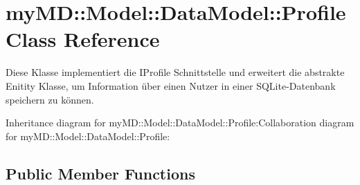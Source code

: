 \hypertarget{classmy_m_d_1_1_model_1_1_data_model_1_1_profile}{
\section{my\-MD::Model::Data\-Model::Profile Class Reference}
\label{d6/d2c/classmy_m_d_1_1_model_1_1_data_model_1_1_profile}
}
Diese Klasse implementiert die IProfile Schnittstelle und erweitert die abstrakte Enitity Klasse, um Information \"{u}ber einen Nutzer in einer SQLite-Datenbank speichern zu k\"{o}nnen.  


Inheritance diagram for my\-MD::Model::Data\-Model::Profile:Collaboration diagram for my\-MD::Model::Data\-Model::Profile:\subsection*{Public Member Functions}
